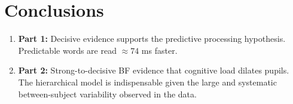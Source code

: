 \documentclass[12pt,a4paper]{article}
\begin{document}
\section{Conclusions}

\begin{tcolorbox}[notebox, title={Summary of Findings}]
\begin{enumerate}[leftmargin=1cm, itemsep=5pt]
  \item \textbf{Part 1:} Decisive evidence supports the predictive processing hypothesis. Predictable words are read $\approx74$ ms faster.
  \item \textbf{Part 2:} Strong-to-decisive BF evidence that cognitive load dilates pupils. The hierarchical model is indispensable given the large and systematic between-subject variability observed in the data.
\end{enumerate}
\end{tcolorbox}
\end{document}
